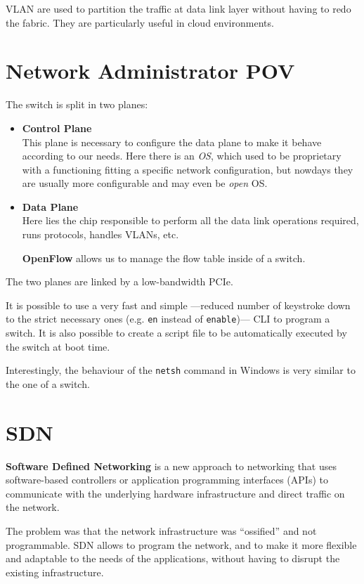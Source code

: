 VLAN are used to partition the traffic at data link layer without having to redo the fabric. They are particularly useful in cloud environments.

\section{Network Administrator POV}
The switch is split in two planes:
\begin{itemize}
   \item \textbf{Control Plane}\\
   This plane is necessary to configure the data plane to make it behave according to our needs.
   Here there is an \textit{OS}, which used to be proprietary with a functioning fitting a specific network configuration, but nowdays they are usually more configurable and may even be \textit{open} OS.
   
   \item \textbf{Data Plane}\\
   Here lies the chip responsible to perform all the data link operations required, runs protocols, handles VLANs, etc.

   \textbf{OpenFlow} allows us to manage the flow table inside of a switch.
\end{itemize}

The two planes are linked by a low-bandwidth PCIe.


It is possible to use a very fast and simple ---reduced number of keystroke down to the strict necessary ones (e.g. \texttt{en} instead of \texttt{enable})--- CLI to program a switch. It is also possible to create a script file to be automatically executed by the switch at boot time.

Interestingly, the behaviour of the \texttt{netsh} command in Windows is very similar to the one of a switch.

\section{SDN}
\textbf{Software Defined Networking} is a new approach to networking that uses software-based controllers or application programming interfaces (APIs) to communicate with the underlying hardware infrastructure and direct traffic on the network.

The problem was that the network infrastructure was ``ossified'' and not programmable. SDN allows to program the network, and to make it more flexible and adaptable to the needs of the applications, without having to disrupt the existing infrastructure.

